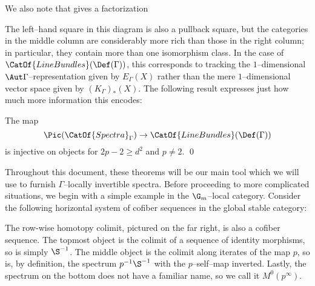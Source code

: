 We also note that  gives a factorization
\begin{center}
\end{center}
The left--hand square in this diagram is also a pullback square, but the categories in the middle column are considerably more rich than those in the right column; in particular, they contain more than one isomorphism class.  In the case of $\CatOf{LineBundles}(\Def(\Gamma))$, this corresponds to tracking the $1$--dimensional $\Aut \Gamma$--representation given by $E_\Gamma(X)$ rather than the mere $1$--dimensional vector space given by $(K_\Gamma)_*(X)$.  The following result expresses just how much more information this encodes:

\begin{lemma}\label{EthyDeterminesPic}
The map \[\Pic(\CatOf{Spectra}_\Gamma) \to \CatOf{LineBundles}(\Def(\Gamma))\] is injective on objects for $2p - 2 \ge d^2$ and $p \ne 2$. \qed
\end{lemma}

Throughout this document, these theorems will be our main tool which we will use to furnish $\Gamma$--locally invertible spectra.  Before proceeding to more complicated situations, we begin with a simple example in the $\G_m$--local category.  Consider the following horizontal system of cofiber sequences in the global stable category:
\begin{center}
\end{center}
The row-wise homotopy colimit, pictured on the far right, is also a cofiber sequence.  The topmost object is the colimit of a sequence of identity morphisms, so is simply $\S^{-1}$.  The middle object is the colimit along iterates of the map $p$, so is, by definition, the spectrum $p^{-1} \S^{-1}$ with the $p$--self--map inverted.  Lastly, the spectrum on the bottom does not have a familiar name, so we call it $M^0(p^\infty)$.

